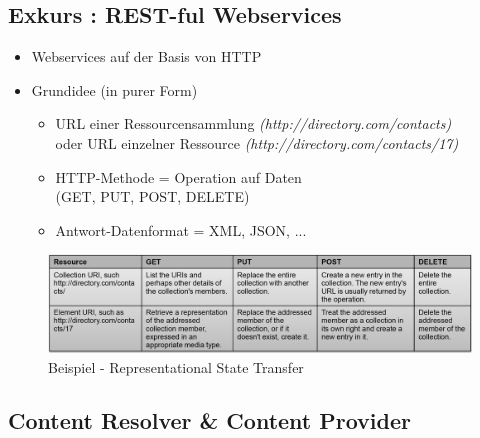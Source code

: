 \documentclass[a4paper]{article}
\begin{document}
\subsection{Exkurs : REST-ful Webservices}

\begin{itemize}
	\item Webservices auf der Basis von HTTP
	\item Grundidee (in purer Form)
		\begin{itemize}
			\item URL einer Ressourcensammlung \textit{(http://directory.com/contacts)}\\
			oder URL einzelner Ressource \textit{(http://directory.com/contacts/17)}
			\item HTTP-Methode = Operation auf Daten\\
			(GET, PUT, POST, DELETE)
			\item Antwort-Datenformat = XML, JSON, ...
		\end{itemize}
\end{itemize}

\begin{figure}[htb!]
	\centering
	\includegraphics[width=\textwidth]{img/state_transfer.png}
	\caption{Beispiel - Representational State Transfer}
\end{figure}

\newpage

\subsection{Content Resolver \& Content Provider}
\end{document}
